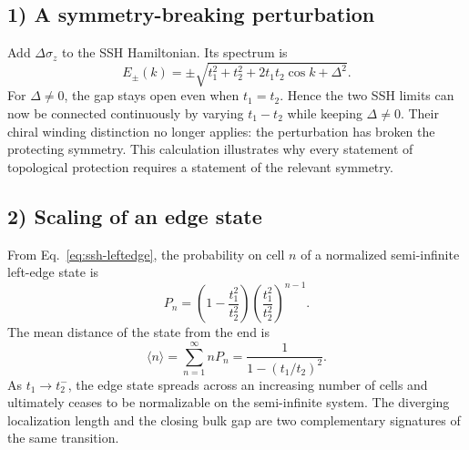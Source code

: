 \subsection*{1) A symmetry-breaking perturbation}
Add $\Delta\sigma_z$ to the SSH Hamiltonian. Its spectrum is
\begin{equation}
 E_\pm(k)=\pm\sqrt{t_1^2+t_2^2+2t_1t_2\cos k+\Delta^2}.
\end{equation}
For $\Delta\ne0$, the gap stays open even when $t_1=t_2$. Hence the two SSH limits can now be connected continuously by varying $t_1-t_2$ while keeping $\Delta\ne0$. Their chiral winding distinction no longer applies: the perturbation has broken the protecting symmetry. This calculation illustrates why every statement of topological protection requires a statement of the relevant symmetry.

\subsection*{2) Scaling of an edge state}
From Eq.~\eqref{eq:ssh-leftedge}, the probability on cell $n$ of a normalized semi-infinite left-edge state is
\begin{equation}
 P_n=\left(1-\frac{t_1^2}{t_2^2}\right)\left(\frac{t_1^2}{t_2^2}\right)^{n-1}.
\end{equation}
The mean distance of the state from the end is
\begin{equation}
 \langle n\rangle=\sum_{n=1}^\infty nP_n
 =\frac1{1-(t_1/t_2)^2}.
\end{equation}
As $t_1\to t_2^-$, the edge state spreads across an increasing number of cells and ultimately ceases to be normalizable on the semi-infinite system. The diverging localization length and the closing bulk gap are two complementary signatures of the same transition.
